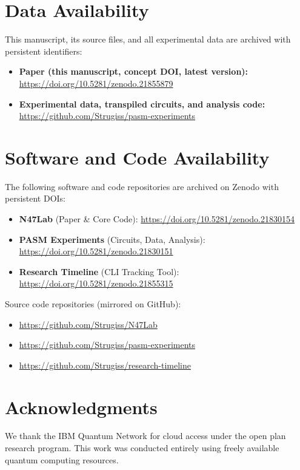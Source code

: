 \documentclass[12pt,a4paper]{article}
\begin{document}
\section*{Data Availability}

This manuscript, its source files, and all experimental data are archived with persistent identifiers:
\begin{itemize}
    \item \textbf{Paper (this manuscript, concept DOI, latest version):} \url{https://doi.org/10.5281/zenodo.21855879}
    \item \textbf{Experimental data, transpiled circuits, and analysis code:} \url{https://github.com/Strugiss/pasm-experiments}
\end{itemize}

\section*{Software and Code Availability}

The following software and code repositories are archived on Zenodo with persistent DOIs:

\begin{itemize}
    \item \textbf{N47Lab} (Paper \& Core Code): \url{https://doi.org/10.5281/zenodo.21830154}
    \item \textbf{PASM Experiments} (Circuits, Data, Analysis): \url{https://doi.org/10.5281/zenodo.21830151}
    \item \textbf{Research Timeline} (CLI Tracking Tool): \url{https://doi.org/10.5281/zenodo.21855315}
\end{itemize}

Source code repositories (mirrored on GitHub):
\begin{itemize}
    \item \url{https://github.com/Strugiss/N47Lab}
    \item \url{https://github.com/Strugiss/pasm-experiments}
    \item \url{https://github.com/Strugiss/research-timeline}
\end{itemize}

\section*{Acknowledgments}

We thank the IBM Quantum Network for cloud access under the open plan research program. This work was conducted entirely using freely available quantum computing resources.
\end{document}
